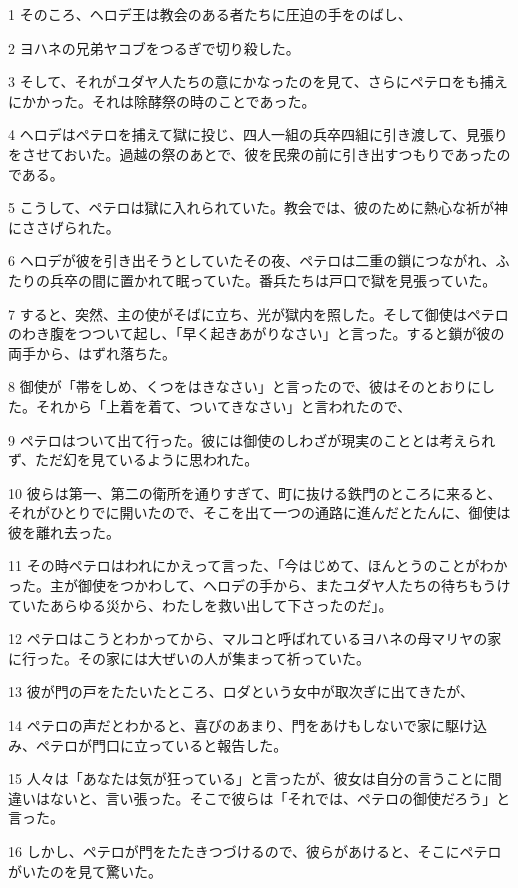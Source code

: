 \par 1 そのころ、ヘロデ王は教会のある者たちに圧迫の手をのばし、
\par 2 ヨハネの兄弟ヤコブをつるぎで切り殺した。
\par 3 そして、それがユダヤ人たちの意にかなったのを見て、さらにペテロをも捕えにかかった。それは除酵祭の時のことであった。
\par 4 ヘロデはペテロを捕えて獄に投じ、四人一組の兵卒四組に引き渡して、見張りをさせておいた。過越の祭のあとで、彼を民衆の前に引き出すつもりであったのである。
\par 5 こうして、ペテロは獄に入れられていた。教会では、彼のために熱心な祈が神にささげられた。
\par 6 ヘロデが彼を引き出そうとしていたその夜、ペテロは二重の鎖につながれ、ふたりの兵卒の間に置かれて眠っていた。番兵たちは戸口で獄を見張っていた。
\par 7 すると、突然、主の使がそばに立ち、光が獄内を照した。そして御使はペテロのわき腹をつついて起し、「早く起きあがりなさい」と言った。すると鎖が彼の両手から、はずれ落ちた。
\par 8 御使が「帯をしめ、くつをはきなさい」と言ったので、彼はそのとおりにした。それから「上着を着て、ついてきなさい」と言われたので、
\par 9 ペテロはついて出て行った。彼には御使のしわざが現実のこととは考えられず、ただ幻を見ているように思われた。
\par 10 彼らは第一、第二の衛所を通りすぎて、町に抜ける鉄門のところに来ると、それがひとりでに開いたので、そこを出て一つの通路に進んだとたんに、御使は彼を離れ去った。
\par 11 その時ペテロはわれにかえって言った、「今はじめて、ほんとうのことがわかった。主が御使をつかわして、ヘロデの手から、またユダヤ人たちの待ちもうけていたあらゆる災から、わたしを救い出して下さったのだ」。
\par 12 ペテロはこうとわかってから、マルコと呼ばれているヨハネの母マリヤの家に行った。その家には大ぜいの人が集まって祈っていた。
\par 13 彼が門の戸をたたいたところ、ロダという女中が取次ぎに出てきたが、
\par 14 ペテロの声だとわかると、喜びのあまり、門をあけもしないで家に駆け込み、ペテロが門口に立っていると報告した。
\par 15 人々は「あなたは気が狂っている」と言ったが、彼女は自分の言うことに間違いはないと、言い張った。そこで彼らは「それでは、ペテロの御使だろう」と言った。
\par 16 しかし、ペテロが門をたたきつづけるので、彼らがあけると、そこにペテロがいたのを見て驚いた。
